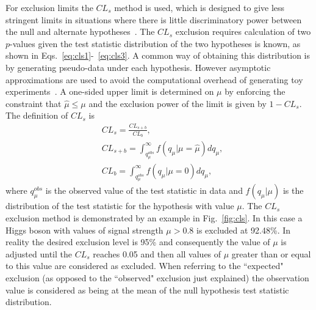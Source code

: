 For exclusion limits the $CL_{s}$ method is used, which is designed to give less stringent limits in situations where there is little discriminatory power between the null and alternate hypotheses~\cite{cls}. The $CL_{s}$ exclusion requires calculation of two $p$-values given the test statistic distribution of the two hypotheses is known, as shown in Eqs.~\ref{eq:cls1}-~\ref{eq:cls3}. A common way of obtaining this distribution is by generating pseudo-data under each hypothesis. However asymptotic approximations are used to avoid the computational overhead of generating toy experiments~\cite{asymptotic_form}. A one-sided upper limit is determined on $\mu$ by enforcing the constraint that $\hat{\mu}\leq\mu$ and the exclusion power of the limit is given by $1-CL_{s}$. The definition of $CL_{s}$ is 
\begin{align}
  & CL_{s} = \frac{CL_{s+b}}{CL_{b}} \label{eq:cls1}, \\
  & CL_{s+b} = \int_{q_{\mu}^{obs}}^{\infty}f(q_{\mu}|\mu=\hat{\mu})dq_{\mu} \label{eq:cls2}, \\
  & CL_{b} = \int_{q_{\mu}^{obs}}^{\infty}f(q_{\mu}|\mu=0)dq_{\mu} \label{eq:cls3}, 
\end{align}
where $q_{\mu}^{obs}$ is the observed value of the test statistic in data and $f(q_{\mu}|\mu)$ is the distribution of the test statistic for the hypothesis with value $\mu$. The $CL_{s}$ exclusion method is demonstrated by an example in Fig.~\ref{fig:cls}. In this case a \SM Higgs boson with values of signal strength $\mu>0.8$ is excluded at 92.48\%. In reality the desired exclusion level is 95\% and consequently the value of $\mu$ is adjusted until the $CL_{s}$ reaches 0.05 and then all values of $\mu$ greater than or equal to this value are considered as excluded. When referring to the ``expected" exclusion (as opposed to the ``observed" exclusion just explained) the observation value is considered as being at the mean of the null hypothesis test statistic distribution.

